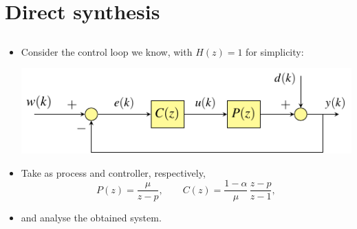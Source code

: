 \section{Direct synthesis}
\subsection{}

\begin{frame}
\myPause
 \begin{itemize}[<+-| alert@+>]
 \item Consider the control loop we know, with $H(z)=1$ for simplicity:
       \begin{center}
        \includegraphics[width=0.50\columnwidth]{./Unit-04/img/ControlLoop-H1.pdf}
       \end{center}
 \item Take as process and controller, respectively,
       \begin{displaymath}
        P(z) = \frac{\mu}{z-p}, \qquad
        C(z) = \frac{1-\alpha}{\mu} \, \frac{z-p}{z-1},
       \end{displaymath}
 \item and analyse the obtained system.
 \end{itemize}
\end{frame}


